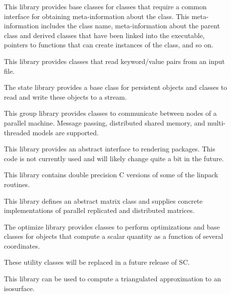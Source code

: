 \documentclass{report}
\begin{document}
\begin{description}
\item[] This library provides base classes for
  classes that require a common interface for obtaining meta-information
  about the class.  This meta-information includes the class name,
  meta-information about the parent class and derived classes that have
  been linked into the executable, pointers to functions that can create
  instances of the class, and so on.

\item[] This library provides classes that read
  keyword/value pairs from an input file.

\item[] The state library provides a base class
  for persistent objects and classes to read and write these objects to a
  stream.

\item[] This group library provides classes to
  communicate between nodes of a parallel machine.  Message passing,
  distributed shared memory, and multi-threaded models are supported.

\item[] This library provides an abstract
  interface to rendering packages.  This code is not currently used and
  will likely change quite a bit in the future.

\item[] This library contains double precision
  C versions of some of the linpack routines.

\item[] This library defines an abstract matrix
  class and supplies concrete implementations of parallel replicated and
  distributed matrices.

\item[] The optimize library provides classes
  to perform optimizations and base classes for objects that compute a
  scalar quantity as a function of several coordinates.

\item[] These utility classes will be replaced
  in a future release of SC.

\item[] This library can be used to compute a
  triangulated approximation to an isosurface.


\end{description}
\end{document}
